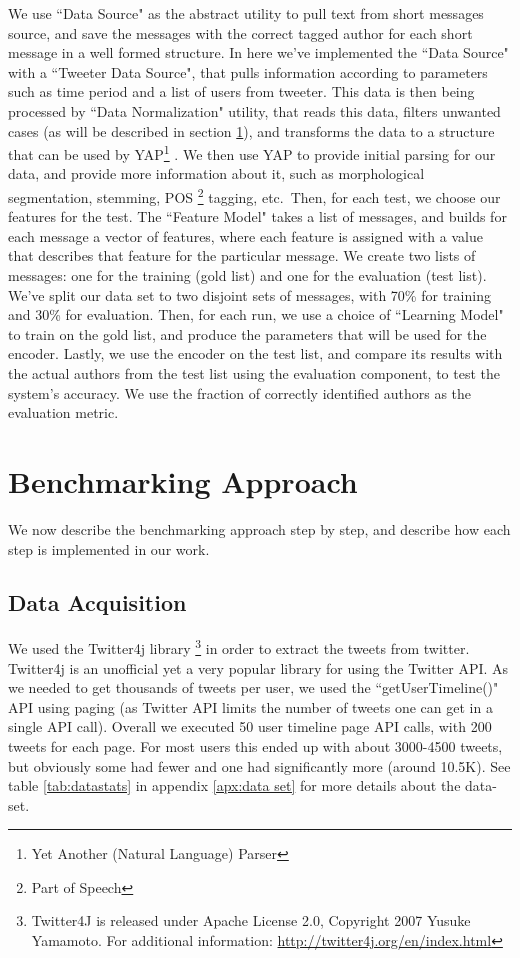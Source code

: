\documentclass[a4paper]{article}
\begin{document}
We use ``Data Source" as the abstract utility to pull text from short messages source, and save the messages with the correct tagged author for each short message in a well formed structure.
In here we've implemented the ``Data Source" with a ``Tweeter Data Source", that pulls information according to parameters such as time period and a list of users from tweeter.
This data is then being processed by ``Data Normalization" utility, that reads this data, filters unwanted cases (as will be described in section \ref{Approach}), and transforms the data to a structure that can be used by YAP\footnote{Yet Another (Natural Language) Parser} \citep{moretsarfatycoling2016}.
We then use YAP to provide initial parsing for our data, and provide more information about it, such as morphological segmentation, stemming, POS \footnote{Part of Speech} tagging, etc.\
Then, for each test, we choose our features for the test. The ``Feature Model" takes a list of messages, and builds for each message a vector of features, where each feature is assigned with a value that describes that feature for the particular message.
We create two lists of messages: one for the training (gold list) and one for the evaluation (test list). We've split our data set to two disjoint sets of messages, with 70\% for training and 30\% for evaluation.
Then, for each run, we use a choice of ``Learning Model" to train on the gold list, and produce the parameters that will be used for the encoder.
Lastly, we use the encoder on the test list, and compare its results with the actual authors from the test list using the evaluation component, to test the system's accuracy.
We use the fraction of correctly identified authors as the evaluation metric.

\section{Benchmarking Approach}
\label{Approach}

We now describe the benchmarking approach step by step, and describe how each step is implemented in our work.
\subsection{Data Acquisition}

We used the Twitter4j library \footnote{ Twitter4J is released under Apache License 2.0, Copyright 2007 Yusuke Yamamoto. For additional information: \url{http://twitter4j.org/en/index.html}} in order to extract the tweets from twitter. Twitter4j is an unofficial yet a very popular library for using the Twitter API. As we needed to get thousands of tweets per user, we used the ``getUserTimeline()" API using paging (as Twitter API limits the number of tweets one can get in a single API call). Overall we executed 50 user timeline page API calls, with 200 tweets for each page. For most users this ended up with about 3000-4500 tweets, but obviously some had fewer and one had significantly more (around 10.5K). See table \ref{tab:datastats} in appendix \ref{apx:data set} for more details about the data-set.
\end{document}

